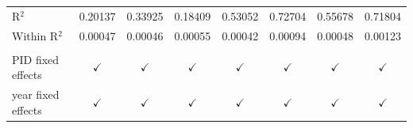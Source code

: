 \begin{tabular}{lccccccc}
   R$^2$              & 0.20137         & 0.33925                       & 0.18409          & 0.53052                           & 0.72704                           & 0.55678                                         & 0.71804\\  
   Within R$^2$       & 0.00047         & 0.00046                       & 0.00055          & 0.00042                           & 0.00094                           & 0.00048                                         & 0.00123\\  
    \\
   PID fixed effects  & $\checkmark$    & $\checkmark$                  & $\checkmark$     & $\checkmark$                      & $\checkmark$                      & $\checkmark$                                    & $\checkmark$\\   
   year fixed effects & $\checkmark$    & $\checkmark$                  & $\checkmark$     & $\checkmark$                      & $\checkmark$                      & $\checkmark$                                    & $\checkmark$\\   
   \bottomrule
\end{tabular}
\par\endgroup


